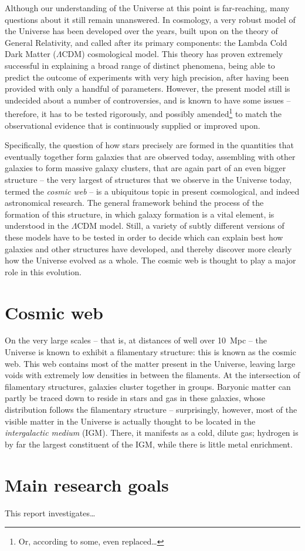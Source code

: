 \noindent Although our understanding of the Universe at this point is far-reaching, many questions about it still remain unanswered. In cosmology, a very robust model of the Universe has been developed over the years, built upon on the theory of General Relativity, and called after its primary components: the Lambda Cold Dark Matter ($\Lambda$CDM) cosmological model. This theory has proven extremely successful in explaining a broad range of distinct phenomena, being able to predict the outcome of experiments with very high precision, after having been provided with only a handful of parameters. However, the present model still is undecided about a number of controversies, and is known to have some issues -- therefore, it has to be tested rigorously, and possibly amended\footnote{Or, according to some, even replaced\dots} to match the observational evidence that is continuously supplied or improved upon.

\par Specifically, the question of how stars precisely are formed in the quantities that eventually together form galaxies that are observed today, assembling with other galaxies to form massive galaxy clusters, that are again part of an even bigger structure -- the very largest of structures that we observe in the Universe today, termed the {\textit{cosmic web}} -- is a ubiquitous topic in present cosmological, and indeed astronomical research. The general framework behind the process of the formation of this structure, in which galaxy formation is a vital element, is understood in the $\Lambda$CDM model. Still, a variety of subtly different versions of these models have to be tested in order to decide which can explain best how galaxies and other structures have developed, and thereby discover more clearly how the Universe evolved as a whole. The cosmic web is thought to play a major role in this evolution.

\section*{Cosmic web}

On the very large scales -- that is, at distances of well over \num{10}~Mpc -- the Universe is known to exhibit a filamentary structure: this is known as the {cosmic web}. This web contains most of the matter present in the Universe, leaving large voids with extremely low densities in between the filaments. At the intersection of filamentary structures, galaxies cluster together in groups. Baryonic matter can partly be traced down to reside in stars and gas in these galaxies, whose distribution follows the filamentary structure -- surprisingly, however, most of the visible matter in the Universe is actually thought to be located in the {\textit{intergalactic medium}} ({IGM}). There, it manifests as a cold, dilute gas; hydrogen is by far the largest constituent of the IGM, while there is little metal enrichment.

\section*{Main research goals}

This report investigates\dots
